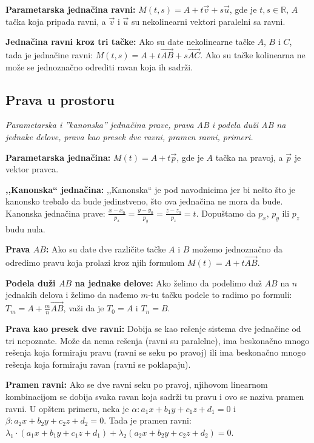 \documentclass[12pt]{article}
\newcommand{\vek}[1]{\overrightarrow{#1}}
\begin{document}
\textbf{Parametarska jednačina ravni:} $M(t,s)=A+t\vek{v}+s\vek{u}$, gde je $t,s\in\mathbb{R}$, $A$
tačka koja pripada ravni, a $\vek{v}$ i $\vek{u}$ su nekolinearni vektori
paralelni sa ravni.
\par

\textbf{Jednačina ravni kroz tri tačke:} Ako su date nekolinearne tačke $A$,
$B$ i $C$, tada je jednačine ravni: $M(t,s)=A+t\vek{AB}+s\vek{AC}$.
Ako su tačke kolinearna ne može se jednoznačno odrediti ravan koja ih sadrži.
\par

\subsection{Prava u prostoru}
\textit{Parametarska i ”kanonska” jednačina prave, prava AB i podela duži AB
    na jednake delove, prava kao presek dve ravni, pramen ravni, primeri.}
\par
\vspace*{1cm}

\textbf{Parametarska jednačina:} $M(t)=A+t\vek{p}$, gde je $A$ tačka na pravoj,
a $\vek{p}$ je vektor pravca.
\par

\textbf{,,Kanonska`` jednačina:} ,,Kanonska`` je pod navodnicima jer bi nešto
što je kanonsko trebalo da bude jedinstveno, što ova jednačina ne mora da bude.
Kanonska jednačina prave:
$\frac{x-x_0}{p_x}=\frac{y-y_0}{p_y}=\frac{z-z_0}{p_z}=t$. Dopuštamo da $p_x$,
$p_y$ ili $p_z$ budu nula.
\par

\textbf{Prava $AB$:} Ako su date dve različite tačke $A$ i $B$ možemo
jednoznačno da odredimo pravu koja prolazi kroz njih formulom
$M(t)=A+t\vek{AB}$.
\par

\textbf{Podela duži $AB$ na jednake delove:} Ako želimo da podelimo duž $AB$ na
$n$ jednakih delova i želimo da nađemo $m$-tu tačku podele to radimo po formuli:
$T_m=A+\frac{m}{n}\vek{AB}$, važi da je $T_0=A$ i $T_n=B$.
\par

\textbf{Prava kao presek dve ravni:} Dobija se kao rešenje sistema dve
jednačine od tri nepoznate. Može da nema rešenja (ravni su paralelne), ima
beskonačno mnogo rešenja koja formiraju pravu (ravni se seku po pravoj) ili ima
beskonačno mnogo rešenja koja formiraju ravan (ravni se poklapaju).
\par

\textbf{Pramen ravni:} Ako se dve ravni seku po pravoj, njihovom linearnom
kombinacijom se dobija svaka ravan koja sadrži tu pravu i ovo se naziva pramen
ravni. U opštem primeru, neka je $\alpha: a_1x+b_1y+c_1z+d_1=0$ i
$\beta: a_2x+b_2y+c_2z+d_2=0$. Tada je pramen ravni:
$\lambda_1\cdot(a_1x+b_1y+c_1z+d_1)+\lambda_2(a_2x+b_2y+c_2z+d_2)=0$.
\end{document}
